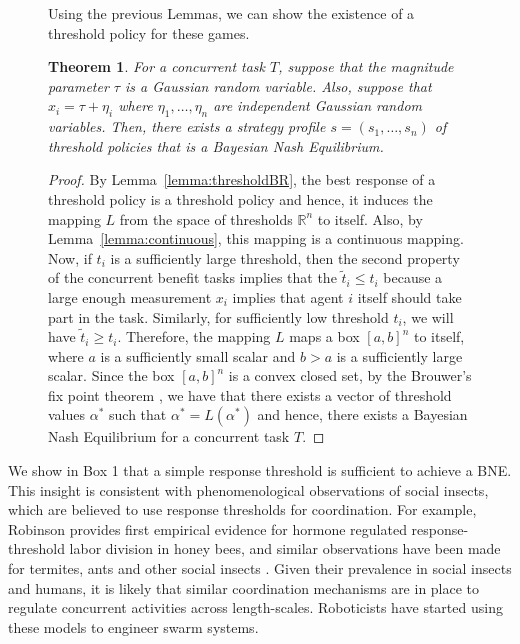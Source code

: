 \documentclass{nature}
\newtheorem{theorem}{Theorem}
\def\R{\mathbb{R}}    %
\begin{document}
\begin{figure}
\begin{framed}
Using the previous Lemmas, we can show the existence of a threshold policy for these games. 
\begin{theorem}\label{thrm:mainthrm}
For a concurrent task $T$, suppose that the magnitude parameter $\tau$ is a Gaussian random variable. Also, suppose that $x_i=\tau+\eta_i$ where $\eta_1,\ldots,\eta_n$ are independent Gaussian random variables. Then, there exists a strategy profile $s=(s_1,\ldots,s_n)$ of threshold policies that is a Bayesian Nash Equilibrium.
\end{theorem}
\begin{proof}
By Lemma~\ref{lemma:thresholdBR}, the best response of a threshold policy is a threshold policy and hence, it induces the mapping $L$ from the space of thresholds $\R^n$ to itself. Also, by Lemma~\ref{lemma:continuous}, this mapping is a continuous mapping. Now, if $t_i$ is a sufficiently large threshold, then the second property of the  concurrent benefit tasks implies that the $\tilde{t}_i\leq t_i$ because a large enough measurement $x_i$ implies that agent $i$ itself should take part in the task. Similarly, for sufficiently low threshold $t_i$, we will have $\tilde{t}_i\geq t_i$. Therefore, the mapping $L$ maps a box $[a,b]^n$ to itself, where $a$ is a sufficiently small scalar and $b>a$ is a sufficiently large scalar. Since the box $[a,b]^n$ is a convex closed set, by the Brouwer's fix point theorem \cite{Border1990}, we have that there exists a vector of threshold values $\alpha^*$ such that $\alpha^*=L(\alpha^*)$ and hence, there exists a Bayesian Nash Equilibrium for a concurrent task $T$.
\end{proof}
\end{framed}
\end{figure}

\linenumbers
We show in Box 1 that a simple response threshold is sufficient to achieve a BNE. This insight is consistent with phenomenological observations of social insects, which are believed to use response thresholds for coordination. For example, Robinson\cite{Robinson1987} provides first empirical evidence for hormone regulated response-threshold labor division in honey bees, and similar observations have been made for termites, ants and other social insects \cite{Bonabeau1999,Camazine2001}. Given their prevalence in social insects and humans, it is likely that similar coordination mechanisms are in place to regulate concurrent activities across length-scales. 
%
%
Roboticists have started using these models to engineer swarm systems\cite{Bonabeau1996,Theraulaz1998,Krieger2000}. %
\end{document}

